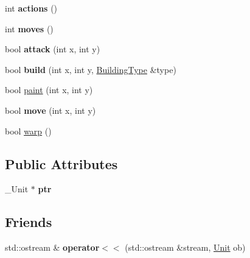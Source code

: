 \begin{CompactItemize}
\item 
\hypertarget{classUnit_21d1e0167e8fd7d5ec8fceebe817df98}{
int \textbf{actions} ()}
\label{classUnit_21d1e0167e8fd7d5ec8fceebe817df98}

\item 
\hypertarget{classUnit_803f4023d9d00c501d9a0b55ac5d5126}{
int \textbf{moves} ()}
\label{classUnit_803f4023d9d00c501d9a0b55ac5d5126}

\item 
\hypertarget{classUnit_b86073c935bec5d959159d837cd9b9c3}{
bool \textbf{attack} (int x, int y)}
\label{classUnit_b86073c935bec5d959159d837cd9b9c3}

\item 
\hypertarget{classUnit_aad323acdd0a291f7d309ac24e01ab9f}{
bool \textbf{build} (int x, int y, \hyperlink{classBuildingType}{BuildingType} \&type)}
\label{classUnit_aad323acdd0a291f7d309ac24e01ab9f}

\item 
bool \hyperlink{classUnit_766eec7dc93515b6d6590fd2c12923a6}{paint} (int x, int y)
\item 
\hypertarget{classUnit_01181b403f885cc2ea06389074626e83}{
bool \textbf{move} (int x, int y)}
\label{classUnit_01181b403f885cc2ea06389074626e83}

\item 
bool \hyperlink{classUnit_46e83270573c33637b588b87132c8905}{warp} ()
\end{CompactItemize}
\subsection*{Public Attributes}
\begin{CompactItemize}
\item 
\hypertarget{classUnit_f5240a8811a31044b1170278d66412f2}{
\_\-Unit $\ast$ \textbf{ptr}}
\label{classUnit_f5240a8811a31044b1170278d66412f2}

\end{CompactItemize}
\subsection*{Friends}
\begin{CompactItemize}
\item 
\hypertarget{classUnit_bba2ea3d62724066fa08ec7d9de7833a}{
std::ostream \& \textbf{operator$<$$<$} (std::ostream \&stream, \hyperlink{classUnit}{Unit} ob)}
\label{classUnit_bba2ea3d62724066fa08ec7d9de7833a}

\end{CompactItemize}


